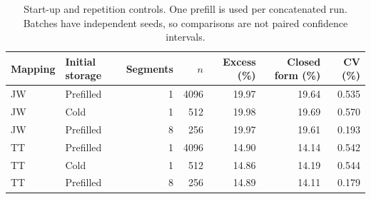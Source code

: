 \begin{table}[htbp]
\centering\small
\begin{tabular}{llrrrrr}
\toprule
Mapping & Initial storage & Segments & $n$ & Excess (\%) & Closed form (\%) & CV (\%)\\\midrule
JW & Prefilled & 1 & 4096 & 19.97 & 19.64 & 0.535\\
JW & Cold & 1 & 512 & 19.98 & 19.69 & 0.570\\
JW & Prefilled & 8 & 256 & 19.97 & 19.61 & 0.193\\
TT & Prefilled & 1 & 4096 & 14.90 & 14.14 & 0.542\\
TT & Cold & 1 & 512 & 14.86 & 14.19 & 0.544\\
TT & Prefilled & 8 & 256 & 14.89 & 14.11 & 0.179\\
\bottomrule
\end{tabular}
\caption{Start-up and repetition controls. One prefill is used per concatenated run. Batches have independent seeds, so comparisons are not paired confidence intervals.}
\label{tab:startup}
\end{table}

